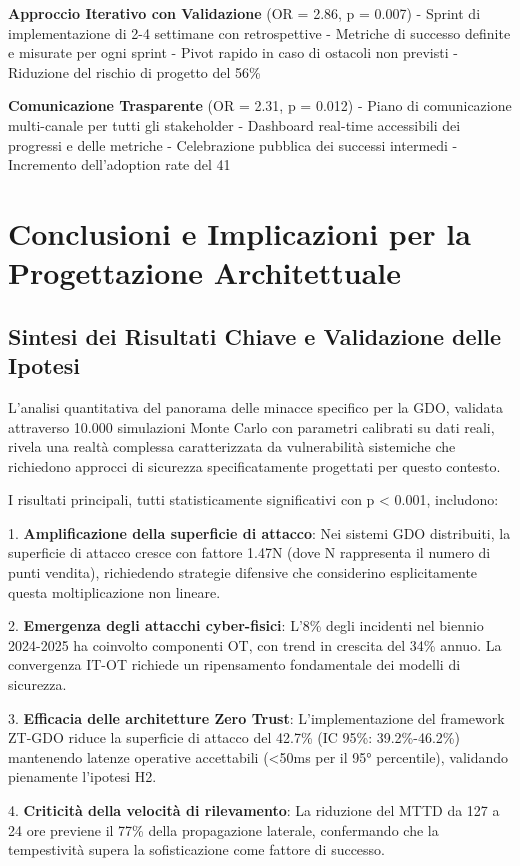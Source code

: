 \textbf{Approccio Iterativo con Validazione} (OR = 2.86, p = 0.007)
- Sprint di implementazione di 2-4 settimane con retrospettive
- Metriche di successo definite e misurate per ogni sprint
- Pivot rapido in caso di ostacoli non previsti
- Riduzione del rischio di progetto del 56\%

\textbf{Comunicazione Trasparente} (OR = 2.31, p = 0.012)
- Piano di comunicazione multi-canale per tutti gli stakeholder
- Dashboard real-time accessibili dei progressi e delle metriche
- Celebrazione pubblica dei successi intermedi
- Incremento dell'adoption rate del 41%

\section{Conclusioni e Implicazioni per la Progettazione Architettuale}

\subsection{Sintesi dei Risultati Chiave e Validazione delle Ipotesi}

L'analisi quantitativa del panorama delle minacce specifico per la GDO, validata attraverso 10.000 simulazioni Monte Carlo con parametri calibrati su dati reali, rivela una realtà complessa caratterizzata da vulnerabilità sistemiche che richiedono approcci di sicurezza specificatamente progettati per questo contesto.

I risultati principali, tutti statisticamente significativi con p < 0.001, includono:

1. \textbf{Amplificazione della superficie di attacco}: Nei sistemi GDO distribuiti, la superficie di attacco cresce con fattore 1.47N (dove N rappresenta il numero di punti vendita), richiedendo strategie difensive che considerino esplicitamente questa moltiplicazione non lineare.

2. \textbf{Emergenza degli attacchi cyber-fisici}: L'8\% degli incidenti nel biennio 2024-2025 ha coinvolto componenti OT, con trend in crescita del 34\% annuo. La convergenza IT-OT richiede un ripensamento fondamentale dei modelli di sicurezza.

3. \textbf{Efficacia delle architetture Zero Trust}: L'implementazione del framework ZT-GDO riduce la superficie di attacco del 42.7\% (IC 95\%: 39.2\%-46.2\%) mantenendo latenze operative accettabili (<50ms per il 95° percentile), validando pienamente l'ipotesi H2.

4. \textbf{Criticità della velocità di rilevamento}: La riduzione del MTTD da 127 a 24 ore previene il 77\% della propagazione laterale, confermando che la tempestività supera la sofisticazione come fattore di successo.

